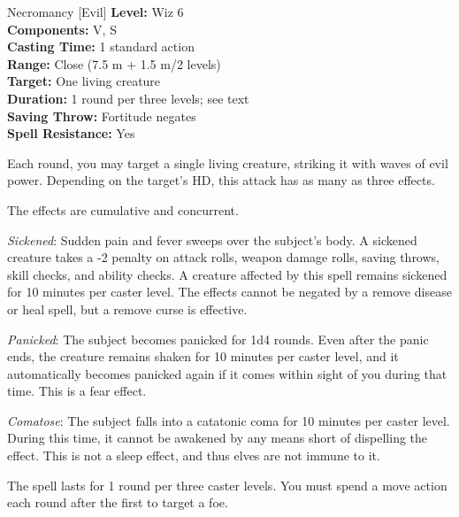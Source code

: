 {Necromancy [Evil]}
{
	\textbf{Level:}
	Wiz 6\\
	\textbf{Components:}
	V, S\\
	\textbf{Casting Time:}
	1 standard action\\
	\textbf{Range:}
	Close (7.5 m + 1.5 m/2 levels)\\
	\textbf{Target:}
	One living creature\\
	\textbf{Duration:}
	1 round per three levels; see text\\
	\textbf{Saving Throw:}
	Fortitude negates\\
	\textbf{Spell Resistance:}
	Yes\\
}
{
	Each round, you may target a single living creature, striking it with waves of evil power. Depending on the target's HD, this attack has as many as three effects.

	The effects are cumulative and concurrent.

	\textit{Sickened}:
	Sudden pain and fever sweeps over the subject's body. A sickened creature takes a -2 penalty on attack rolls, weapon damage rolls, saving throws, skill checks, and ability checks. A creature affected by this spell remains sickened for 10 minutes per caster level. The effects cannot be negated by a remove disease or heal spell, but a remove curse is effective.

	\textit{Panicked}:
	The subject becomes panicked for 1d4 rounds. Even after the panic ends, the creature remains shaken for 10 minutes per caster level, and it automatically becomes panicked again if it comes within sight of you during that time. This is a fear effect.

	\textit{Comatose}:
	The subject falls into a catatonic coma for 10 minutes per caster level. During this time, it cannot be awakened by any means short of dispelling the effect. This is not a sleep effect, and thus elves are not immune to it.

	The spell lasts for 1 round per three caster levels. You must spend a move action each round after the first to target a foe.

}
